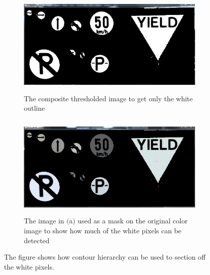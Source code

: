 \documentclass{article}
\begin{document}
\begin{figure}[H]
\begin{subfigure}{0.5\textwidth}
\includegraphics[width=0.9\linewidth, height=5cm]{N_WHT_TRSH3.PNG} 
\caption{The composite thresholded image to get only the white outline}
\label{fig:subim1}
\end{subfigure}
\begin{subfigure}{0.5\textwidth}

\includegraphics[width=0.9\linewidth, height=5cm]{N_WHITE_CROP3.PNG}
\caption{The image in $($a$)$ used as a mask on the original color image to show how much of the white pixels can be detected}
\label{fig:subim2}
\end{subfigure}
\caption{The figure shows how contour hierarchy can be used to section off the white pixels.}
\label{fig:image2}
\end{figure}
\end{document}
